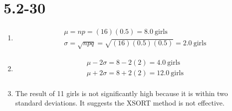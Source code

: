 \documentclass[12pt,fleqn]{article}
\newcommand{\chapter}{5.2}
\newcommand{\problem}[1]{\vspace{5ex}\section*{\chapter-#1}}
\begin{document}
\problem{30}
\begin{enumerate}[label=\alph*.]
\item
  \begin{align*}
    \mu = np = (16)(0.5) = 8.0~\text{girls} \\
    \sigma = \sqrt{npq} = \sqrt{(16)(0.5)(0.5)} = 2.0~\text{girls}
  \end{align*}
\item
  \begin{align*}
    \mu - 2\sigma = 8 - 2(2) = 4.0~\text{girls} \\
    \mu + 2\sigma = 8 + 2(2) = 12.0~\text{girls} \\
  \end{align*}
\item
  The result of 11 girls is not significantly high because it is within two standard deviations. It suggests the XSORT method is not effective.
\end{enumerate}
\end{document}
